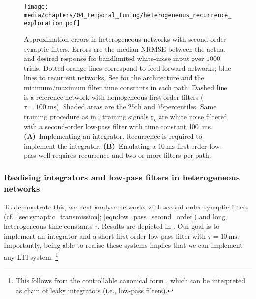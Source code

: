\begin{figure}
	\centering
	\texttt{[image: media/chapters/04\_temporal\_tuning/heterogeneous\_recurrence\_exploration.pdf]}
	\caption[Approximation errors in heterogeneous networks with second-order synaptic filters]{Approximation errors in heterogeneous networks with second-order synaptic filters.
	Errors are the median NRMSE between the actual and desired response for bandlimited white-noise input over $1000$ trials.
	Dotted orange lines correspond to feed-forward networks; blue lines to recurrent networks.
	See  for the architecture and the minimum/maximum filter time constants in each path.
	Dashed line is a reference network with homogeneous first-order filters ($\tau = \SI{100}{\milli\second}$).
	Shaded areas are the $25$th and $75$percentiles.
	Same training procedure as in ; training signals $\mathfrak{x}_k$ are white noise filtered with a second-order low-pass filter with time constant \SI{100}{\milli\second}.
	\textbf{(A)}~Implementing an integrator.
	Recurrence is required to implement the integrator.
	\textbf{(B)}~Emulating a $\SI{10}{\milli\second}$ first-order low-pass well requires recurrence and two or more filters per path.
	}
	\label{fig:heterogeneous_recurrence_exploration}
\end{figure}

\subsubsection{Realising integrators and low-pass filters in heterogeneous networks}
To demonstrate this, we next analyse networks with second-order synaptic filters (cf.~\cref{sec:synaptic_transmission}; \cref{eqn:low_pass_second_order}) and long, heterogeneous time-constants $\tau$.
Results are depicted in .
Our goal is to implement an integrator and a short first-order low-pass filter with $\tau = \SI{10}{\milli\second}$.
Importantly, being able to realise these systems implies that we can implement any LTI system.%
\footnote{This follows from the controllable canonical form \citep[cf.][Section~3.4.4]{verhaegen2007filtering}, which can be interpreted as chain of leaky integrators (i.e., low-pass filters).}

